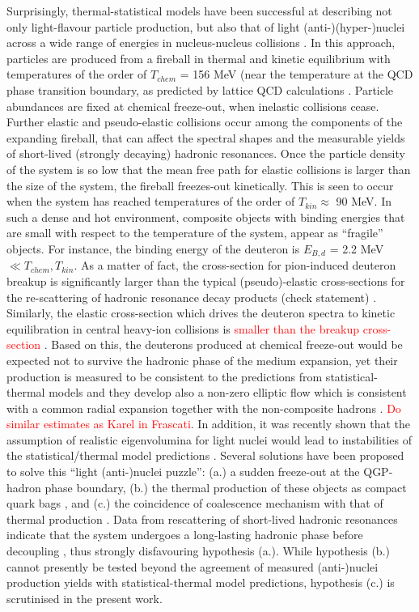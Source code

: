 \documentclass[a4paper,11pt]{scrartcl} %
\begin{document}
Surprisingly, thermal-statistical models have been successful at describing not only light-flavour particle production, but also that of light (anti-)(hyper-)nuclei across a wide range of energies in nucleus-nucleus collisions \cite{Andronic:2017, Andronic:2010qu}. 
In this approach, particles are produced from a fireball in thermal and kinetic equilibrium with temperatures of the order of $T_{chem}$ = 156 MeV (near the temperature at the QCD phase transition boundary, as predicted by lattice QCD calculations \cite{Bazavov:2014pvz}. Particle abundances are fixed at chemical freeze-out, when inelastic collisions cease. Further elastic and pseudo-elastic collisions occur among the components of the expanding fireball, that can affect the spectral shapes and the measurable yields of short-lived (strongly decaying) hadronic resonances. Once the particle density of the system is so low that the mean free path for elastic collisions is larger than the size of the system, the fireball freezes-out kinetically. This is seen to occur when the system has reached temperatures of the order of $T_{kin} \approx$ 90 MeV. 
In such a dense and hot environment, composite objects with binding energies that are small with respect to the temperature of the system, appear as ``fragile'' objects. For instance, the binding energy of the deuteron is $E_{B, d}$ = 2.2 MeV $\ll T_{chem}, T_{kin}$.
As a matter of fact, the cross-section for pion-induced deuteron breakup is significantly larger than the typical (pseudo)-elastic cross-sections for the re-scattering of hadronic resonance decay products (check statement) \cite{Garcilazo:1982yc, Bass:1998ca, Schukraft:2017nbn}. 
Similarly, the elastic cross-section which drives the deuteron spectra to kinetic equilibration in central heavy-ion collisions \cite{Acharya:2017dmc} is \textcolor{red}{smaller than the breakup cross-section} \cite{Schukraft:2017nbn}.   
Based on this, the deuterons produced at chemical freeze-out would be expected not to survive the hadronic phase of the medium expansion, yet their production is measured to be consistent to the predictions from statistical-thermal models and they develop also a non-zero elliptic flow which is consistent with a common radial expansion together with the non-composite hadrons \cite{Acharya:2017dmc}. 
\textcolor{red}{Do similar estimates as Karel in Frascati}. In addition, it was recently shown that the assumption of realistic eigenvolumina for light nuclei would lead to instabilities of the statistical/thermal model predictions \cite{Vovchenko:2016mwg}.
Several solutions have been proposed to solve this ``light (anti-)nuclei puzzle'': (a.) a sudden freeze-out at the QGP-hadron phase boundary, (b.) the thermal production of these objects as compact quark bags \cite{Andronic:2017}, and (c.) the coincidence of coalescence mechanism with that of thermal production \cite{Scheibl:1998tk}.
Data from rescattering of short-lived hadronic resonances indicate that the system undergoes a long-lasting hadronic phase before decoupling \cite{Abelev:2014uua}, thus strongly disfavouring hypothesis (a.). 
While hypothesis (b.) cannot presently be tested beyond the agreement of measured (anti-)nuclei production yields with statistical-thermal model predictions, hypothesis (c.) is scrutinised in the present work.
\end{document}
